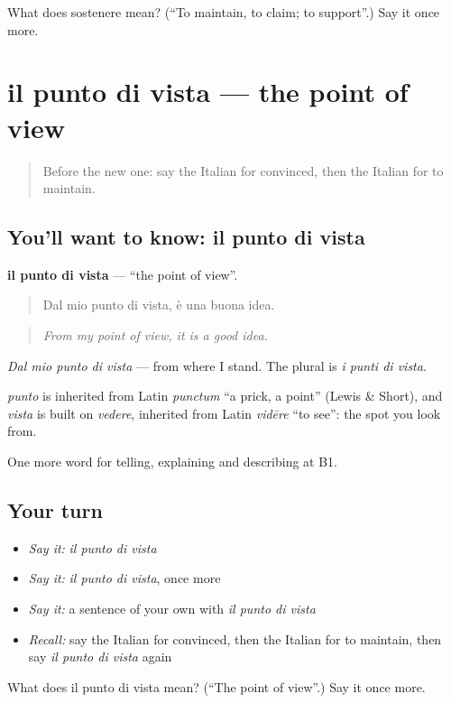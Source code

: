\begin{tcolorbox}[breakable,colback=teal!4,colframe=teal!35!black,title={Before you move on}]
What does sostenere mean? (\textquotedblleft{}To maintain, to claim; to support\textquotedblright{}.) Say it once more.
\end{tcolorbox}
\section[il punto di vista]{il punto di vista — the point of view}

\label{lesson:IT-C339-punto-di-vista}



\begin{quote}
Before the new one: say the Italian for convinced, then the Italian for to maintain.
\end{quote}

\subsection*{You'll want to know: il punto di vista}
\textbf{il punto di vista} — \textquotedblleft{}the point of view\textquotedblright{}.

\begin{quote}
Dal mio punto di vista, è una buona idea.
\end{quote}

\begin{quote}
\emph{From my point of view, it is a good idea.}
\end{quote}

\emph{Dal mio punto di vista} — from where I stand. The plural is \emph{i punti di vista}.

\begin{cousinweb}
\emph{punto} is inherited from Latin \emph{punctum} \textquotedblleft{}a prick, a point\textquotedblright{} (Lewis \& Short), and \emph{vista} is built on \emph{vedere}, inherited from Latin \emph{vidēre} \textquotedblleft{}to see\textquotedblright{}: the spot you look from.
\end{cousinweb}

\begin{grammarlens}[title={What you've built}]
One more word for telling, explaining and describing at B1.
\end{grammarlens}

\subsection*{Your turn}
\begin{itemize}
\raggedright
  \item \emph{Say it:} \emph{il punto di vista}
  \item \emph{Say it:} \emph{il punto di vista}, once more
  \item \emph{Say it:} a sentence of your own with \emph{il punto di vista}
  \item \emph{Recall:} say the Italian for convinced, then the Italian for to maintain, then say \emph{il punto di vista} again
\end{itemize}

\begin{tcolorbox}[breakable,colback=teal!4,colframe=teal!35!black,title={Before you move on}]
What does il punto di vista mean? (\textquotedblleft{}The point of view\textquotedblright{}.) Say it once more.
\end{tcolorbox}
